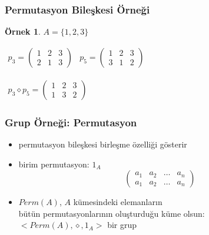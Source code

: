 \documentclass[dvipsnames]{beamer}
\theoremstyle{definition}
\theoremstyle{example}
\newtheorem{ornek}[theorem]{Örnek}
\theoremstyle{plain}
\begin{document}
\begin{frame}
  \frametitle{Permutasyon Bileşkesi Örneği}

  \begin{ornek}
    $A = \{1,2,3\}$

    \medskip
    $\begin{array}{cc}
      p_3 = \left(
        \begin{array}{ccc}
          1 & 2 & 3\\
          2 & 1 & 3
        \end{array}
      \right) &
      p_5 = \left(
        \begin{array}{ccc}
          1 & 2 & 3\\
          3 & 1 & 2
        \end{array}
      \right)
    \end{array}$

    \medskip
    $\begin{array}{c}
      p_3 \diamond p_5 = \left(
        \begin{array}{ccc}
          1 & 2 & 3\\
          1 & 3 & 2
        \end{array}
      \right)
    \end{array}$
  \end{ornek}
\end{frame}

\begin{frame}
  \frametitle{Grup Örneği: Permutasyon}

  \begin{itemize}
    \item permutasyon bileşkesi birleşme özelliği gösterir
    \item birim permutasyon: $1_A$
    \[\left(
      \begin{array}{cccc}
         a_1 & a_2 & \dots & a_n\\
         a_1 & a_2 & \dots & a_n
      \end{array}
    \right)\]

    \pause
    \medskip
    \item $Perm(A)$, $A$ kümesindeki elemanların\\
      bütün permutasyonlarının oluşturduğu küme olsun:\\
      $<Perm(A), \diamond, 1_A>$ bir grup
  \end{itemize}
\end{frame}
\end{document}
